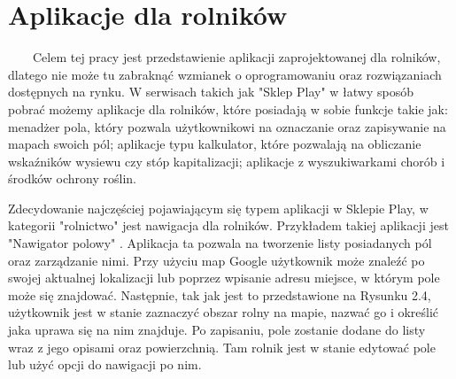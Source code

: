 \documentclass[a4paper,12pt,oneside]{book}
\begin{document}
	\section{Aplikacje dla rolników}
	\ \ \ \
	Celem tej pracy jest przedstawienie aplikacji zaprojektowanej dla rolników, dlatego nie może tu zabraknąć wzmianek o oprogramowaniu oraz rozwiązaniach dostępnych na rynku. W serwisach takich jak "Sklep Play" w łatwy sposób pobrać możemy aplikacje dla rolników, które posiadają w sobie funkcje takie jak: menadżer pola, który pozwala użytkownikowi na oznaczanie oraz zapisywanie na mapach swoich pól; aplikacje typu kalkulator, które pozwalają na obliczanie wskaźników wysiewu czy stóp kapitalizacji; aplikacje z wyszukiwarkami chorób i środków ochrony roślin.
	
	Zdecydowanie najczęściej pojawiającym się typem aplikacji w Sklepie Play, w kategorii "rolnictwo" jest nawigacja dla rolników. Przykładem takiej aplikacji jest "Nawigator polowy" \cite{ref6}. Aplikacja ta pozwala na tworzenie listy posiadanych pól oraz zarządzanie nimi. Przy użyciu map Google użytkownik może znaleźć po swojej aktualnej lokalizacji lub poprzez wpisanie adresu miejsce, w którym pole może się znajdować. Następnie, tak jak jest to przedstawione na Rysunku 2.4, użytkownik jest w stanie zaznaczyć obszar rolny na mapie, nazwać go i określić jaka uprawa się na nim znajduje. Po zapisaniu, pole zostanie dodane do listy wraz z jego opisami oraz powierzchnią. Tam rolnik jest w stanie edytować pole lub użyć opcji do nawigacji po nim.
	
\end{document}
